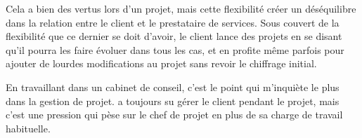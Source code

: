 Cela a bien des vertus lors d'un projet, mais cette flexibilité créer un déséquilibre dans la relation entre le client et le prestataire de services. Sous couvert de la flexibilité que ce dernier se doit d'avoir, le client lance des projets en se disant qu'il pourra les faire évoluer dans tous les cas, et en profite même parfois pour ajouter de lourdes modifications au projet sans revoir le chiffrage initial.

En travaillant dans un cabinet de conseil, c'est le point qui m'inquiète le plus dans la gestion de projet. \damien a toujours su gérer le client pendant le projet, mais c'est une pression qui pèse sur le chef de projet en plus de sa charge de travail habituelle.
